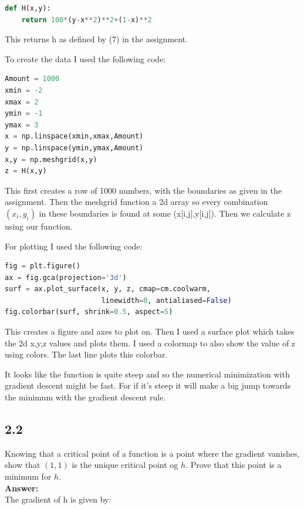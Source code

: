 \documentclass[a4paper]{article}
\begin{document}
\begin{lstlisting}[language=Python]
def H(x,y):
    return 100*(y-x**2)**2+(1-x)**2
\end{lstlisting}

This returns h as defined by (7) in the assignment.

To create the data I used the following code:

\begin{lstlisting}[language=Python]
Amount = 1000
xmin = -2
xmax = 2
ymin = -1
ymax = 3
x = np.linspace(xmin,xmax,Amount)
y = np.linspace(ymin,ymax,Amount)
x,y = np.meshgrid(x,y)
z = H(x,y)
\end{lstlisting}

This first creates a row of 1000 numbers, with the boundaries as given in the assignment. Then the meshgrid function a 2d array so every combination $(x_i,y_i)$ in these boundaries is found at some (x[i,j],y[i,j]). Then we calculate z using our function.

For plotting I used the following code:

\begin{lstlisting}[language=Python]
fig = plt.figure()
ax = fig.gca(projection='3d')
surf = ax.plot_surface(x, y, z, cmap=cm.coolwarm,
                       linewidth=0, antialiased=False)
fig.colorbar(surf, shrink=0.5, aspect=5)
\end{lstlisting}


This creates a figure and axes to plot on. Then I used a surface plot which takes the 2d x,y,z values and plots them. I used a colormap to also show the value of z using colors. The last line plots this colorbar.

It looks like the function is quite steep and so the numerical minimization with gradient descent might be fast. For if it's steep it will make a big jump towards the minimum with the gradient descent rule.

\subsection*{2.2}

Knowing that a critical point of a function is a point where the gradient vanishes, show that $(1,1)$ is the unique critical point og $h$. Prove that this point is a minimum for $h$.\\

\textbf{Answer:}\\

The gradient of h is given by:
\end{document}
